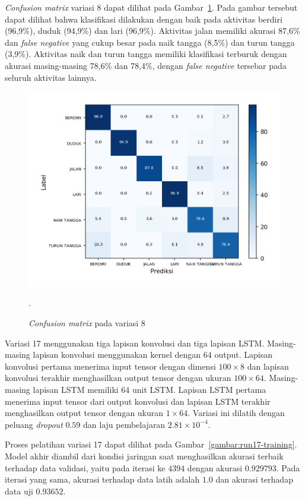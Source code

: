 \textit{Confusion matrix} variasi 8 dapat dilihat pada Gambar~\ref{gambar:run8-confusion-martix}. Pada gambar tersebut dapat dilihat bahwa klasifikasi dilakukan dengan baik pada aktivitas berdiri (96,9\%), duduk (94,9\%) dan lari (96,9\%). Aktivitas jalan memiliki akurasi 87,6\% dan \textit{false negative} yang cukup besar pada naik tangga (8,5\%) dan turun tangga (3,9\%). Aktivitas naik dan turun tangga memiliki klasifikasi terburuk dengan akurasi masing-masing 78,6\% dan 78,4\%, dengan \textit{false negative} tersebar pada seluruh aktivitas lainnya.

\begin{figure}[h!]
    \centering
    \includegraphics[width=13cm]{gambar/hasil-pembahasan/run8-confusion-matrix.png}
    \caption{\textit{Confusion matrix} pada variasi 8}.
    \label{gambar:run8-confusion-martix}
\end{figure}

Variasi 17 menggunakan tiga lapisan konvolusi dan tiga lapisan LSTM\@. Masing-masing lapisan konvolusi menggunakan kernel dengan $64$ output. Lapisan konvolusi pertama menerima input tensor dengan dimensi $100 \times 8$ dan lapisan konvolusi terakhir menghasilkan output tensor dengan ukuran $100 \times 64$. Masing-masing lapisan LSTM memiliki $64$ unit LSTM\@. Lapisan LSTM pertama menerima input tensor dari output konvolusi dan lapisan LSTM terakhir menghasilkan output tensor dengan ukuran $1 \times 64$. Variasi ini dilatih dengan peluang \textit{dropout} $0.59$ dan laju pembelajaran $2.81 \times 10^{-4}$.

Proses pelatihan variasi 17 dapat dilihat pada Gambar~\ref{gambar:run17-training}. Model akhir diambil dari kondisi jaringan saat menghasilkan akurasi terbaik terhadap data validasi, yaitu pada iterasi ke $4394$ dengan akurasi $0.929793$. Pada iterasi yang sama, akurasi terhadap data latih adalah $1.0$ dan akurasi terhadap data uji  $0.93652$.

